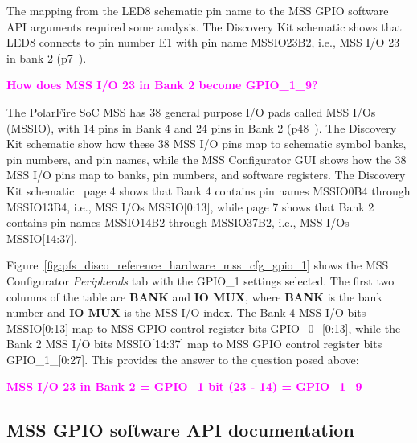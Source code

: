 The mapping from the LED8 schematic pin name to the MSS GPIO software API
arguments required some analysis. The Discovery Kit schematic shows that LED8
connects to pin number E1 with pin name \textsf{MSSIO23B2}, i.e., MSS I/O 23 in
bank 2 (p7~\cite{Microchip_DISCO_SCH_2023}).
%
\begin{center}
\textcolor{magenta}{\bf How does MSS I/O 23 in Bank 2 become GPIO\_1\_9?}
\end{center}
%
The PolarFire SoC MSS has 38 general purpose I/O pads called MSS I/Os (MSSIO),
with 14 pins in Bank 4 and 24 pins in Bank 2 (p48~\cite{Microchip_PFSoC_TRM_2025}).
%
The Discovery Kit schematic show how these 38 MSS I/O pins map to schematic
symbol banks, pin numbers, and pin names, while the MSS Configurator GUI shows how
the 38 MSS I/O pins map to banks, pin numbers, and software registers.
%
The Discovery Kit schematic~\cite{Microchip_DISCO_SCH_2023} page 4 shows
that Bank 4 contains pin names \textsf{MSSIO0B4} through \textsf{MSSIO13B4},
i.e., MSS I/Os \textsf{MSSIO[0:13]}, while page 7 shows that Bank 2
contains pin names \textsf{MSSIO14B2} through \textsf{MSSIO37B2}, i.e.,
MSS I/Os \textsf{MSSIO[14:37]}.

Figure~\ref{fig:pfs_disco_reference_hardware_mss_cfg_gpio_1} shows the
MSS Configurator \emph{Peripherals} tab with the GPIO\_1 settings
selected. The first two columns of the table are \textbf{BANK} and
\textbf{IO MUX}, where \textbf{BANK} is the bank number and \textbf{IO MUX}
is the MSS I/O index.
%
The Bank 4 MSS I/O bits \textsf{MSSIO[0:13]} map to MSS GPIO control
register bits \textsf{GPIO\_0\_[0:13]}, while
the Bank 2 MSS I/O bits \textsf{MSSIO[14:37]} map to MSS GPIO control
register bits \textsf{GPIO\_1\_[0:27]}. This provides the answer to
the question posed above:
%
\begin{center}
\textcolor{magenta}{\bf MSS I/O 23 in Bank 2 = GPIO\_1 bit (23 - 14) = GPIO\_1\_9}
\end{center}

\subsection{MSS GPIO software API documentation}


